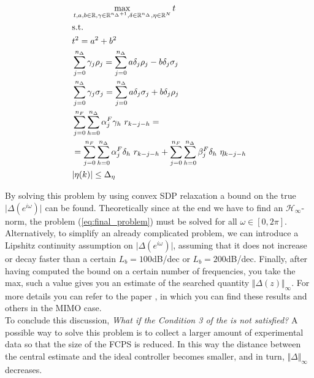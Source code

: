 \begin{equation}\label{eq:final_problem}
    \begin{aligned}
        &\max_{t,a,b\in\mathbb{R}, \gamma\in\mathbb{R}^{n_\Delta+1}, 
    \delta\in\mathbb{R}^{n_\Delta}, \eta\in\mathbb{R}^N} {t}\\
    &\text{s.t.}\\
    &t^2=a^2+b^2\\
    &\sum_{j=0}^{n_\Delta} {\color{black}\gamma_j} \rho_j= \sum_{j=0}^{n_\Delta}{
        {\color{black}a\delta_j} \rho_j  -  {\color{black}b\delta_j} \sigma_j 
   }\\
   &\sum_{j=0}^{n_\Delta} {\color{black}\gamma_j} \sigma_j= \sum_{j=0}^{n_\Delta}{
       {\color{black}a \delta_j} \sigma_j  + {\color{black}b \delta_j} \rho_j 
   }\\
   &\sum_{j=0}^{n_F} \sum_{h=0}^{n_\Delta} {\alpha_j^F {\color{black}\gamma_h} \ r_{k-j-h}} =\\
        &=\sum_{j=0}^{n_F} \sum_{h=0}^{n_\Delta}{\alpha_j^F {\color{black}\delta_h} \ r_{k-j-h}} +
        \sum_{j=0}^{n_F} \sum_{h=0}^{n_\Delta}{\beta_j^F {\color{black}\delta_h} \ \eta_{k-j-h}}\\
    &\vert \eta(k) \vert \le \Delta_\eta
    \end{aligned}
\end{equation}

By solving this problem by using convex SDP relaxation a bound on the true $\vert\Delta(e^{i\omega})\vert$ can be found. Theoretically since at the end we have to find an $\mathcal{H}_\infty$-norm, the problem (\ref{eq:final_problem}) must be solved for all $\omega\in[0,2\pi]$. Alternatively, to simplify an already complicated problem, we can introduce a Lipshitz continuity assumption on $\vert \Delta(e^{i\omega})\vert$, assuming that it does not increase or decay faster than a certain $L_b=100$dB/dec or $L_b=200$dB/dec. Finally, after having computed the bound on a certain number of frequencies, you take the max, such a value gives you an estimate of the searched quantity $\Vert \Delta(z) \Vert_\infty$. For more details you can refer to the paper \cite{abuabiah2023non}, in which you can find these results and others in the MIMO case.\\

\noindent
To conclude this discussion, \textit{What if the Condition 3 of the  is not satisfied?} A possible way to solve this problem is to collect a larger amount of experimental data so that the size of the FCPS is reduced. In this way the distance between the central estimate and the ideal controller becomes smaller, and in turn, $\Vert \Delta \Vert_\infty$ decreases.



